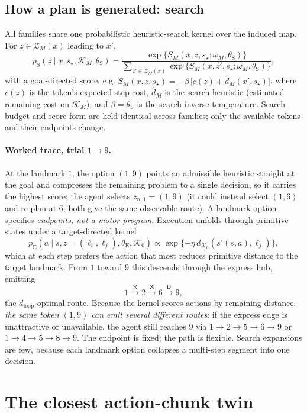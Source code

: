 \documentclass[11pt]{article}
\begin{document}
\subsection{How a plan is generated: search}

All families share one probabilistic heuristic-search kernel over the induced map. For
$z\in\mathcal Z_M(x)$ leading to $x'$,
\[
p_{\mathrm S}(z\mid x,s_\star,\mathcal K_M,\theta_{\mathrm S})
=\frac{\exp\{S_M(x,z,s_\star;\omega_M,\theta_{\mathrm S})\}}
{\sum_{z'\in\mathcal Z_M(x)}\exp\{S_M(x,z',s_\star;\omega_M,\theta_{\mathrm S})\}},
\]
with a goal-directed score, e.g.
$S_M(x,z,s_\star)=-\beta\,\bigl[c(z)+\widehat d_{M}(x',s_\star)\bigr]$,
where $c(z)$ is the token's expected step cost, $\widehat d_M$ is the search heuristic
(estimated remaining cost on $\mathcal K_M$), and $\beta=\theta_{\mathrm S}$ is the search
inverse-temperature. Search budget and score form are held identical across families; only
the available tokens and their endpoints change.

\paragraph{Worked trace, trial $1\to9$.}
At the landmark $1$, the option $(1,9)$ points an admissible heuristic straight at the
goal and compresses the remaining problem to a single decision, so it carries the highest
score; the agent selects $z_{n,1}=(1,9)$ (it could instead select $(1,6)$ and re-plan at
$6$; both give the same observable route). A landmark option specifies \emph{endpoints,
not a motor program}. Execution unfolds through primitive states under a target-directed
kernel
\[
p_{\mathrm E}(a\mid s,z=(\ell_i,\ell_j),\theta_{\mathrm E},\mathcal K_0)
\propto
\exp\{-\eta\,d_{\mathcal K_0}(s'(s,a),\ell_j)\},
\]
which at each step prefers the action that most reduces primitive distance to the target
landmark. From $1$ toward $9$ this descends through the express hub, emitting
\[
1\xrightarrow{\mathsf R}2\xrightarrow{\mathsf X}6\xrightarrow{\mathsf D}9 ,
\]
the $d_{\mathrm{loop}}$-optimal route. Because the kernel scores actions by remaining
distance, \emph{the same token $(1,9)$ can emit several different routes}: if the express
edge is unattractive or unavailable, the agent still reaches $9$ via $1\to2\to5\to6\to9$
or $1\to4\to5\to8\to9$. The endpoint is fixed; the path is flexible. Search expansions are
few, because each landmark option collapses a multi-step segment into one decision.

\section{The closest action-chunk twin}
\end{document}
